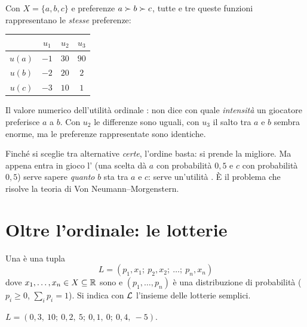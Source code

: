 Con $X = \{a,b,c\}$ e preferenze $a \succ b \succ c$, tutte e tre queste funzioni
rappresentano le \emph{stesse} preferenze:
\begin{center}
\renewcommand{\arraystretch}{1.15}
\begin{tabular}{cccc}
\toprule
 & $u_1$ & $u_2$ & $u_3$ \\
\midrule
$u(a)$ & $-1$ & $30$ & $90$ \\
$u(b)$ & $-2$ & $20$ & $2$ \\
$u(c)$ & $-3$ & $10$ & $1$ \\
\bottomrule
\end{tabular}
\end{center}
Il valore numerico dell'utilità ordinale : non dice
con quale \emph{intensità} un giocatore preferisce $a$ a $b$. Con $u_2$ le
differenze sono uguali, con $u_3$ il salto tra $a$ e $b$ sembra enorme, ma le
preferenze rappresentate sono identiche.

\begin{osservazione}
Finché si sceglie tra alternative \emph{certe}, l'ordine basta: si prende la migliore.
Ma appena entra in gioco l' (una scelta dà $a$ con probabilità $0{,}5$ e
$c$ con probabilità $0{,}5$) serve sapere \emph{quanto} $b$ sta tra $a$ e $c$: serve
un'utilità . È il problema che risolve la teoria di Von Neumann--Morgenstern.
\end{osservazione}

\section{Oltre l'ordinale: le lotterie}

\begin{definizione}
Una  è una tupla
\[
  L = (p_1, x_1;\ p_2, x_2;\ \dots;\ p_n, x_n)
\]
dove $x_1,\dots,x_n \in X \subseteq \mathbb{R}$ sono  e
$(p_1,\dots,p_n)$ è una distribuzione di probabilità ($p_i \ge 0$, $\sum_i p_i = 1$).
Si indica con $\mathcal{L}$ l'insieme delle lotterie semplici.
\end{definizione}

\begin{esempio}
$L = (0{,}3,\ 10;\ 0{,}2,\ 5;\ 0{,}1,\ 0;\ 0{,}4,\ -5)$.
\begin{center}
\end{center}
\end{esempio}


